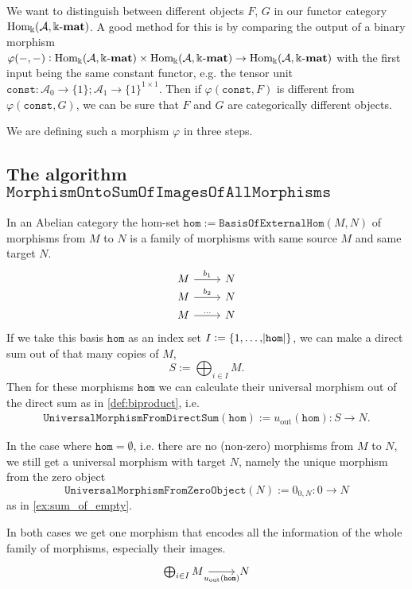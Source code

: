 
We want to distinguish between different objects $F$, $G$ in our functor category $\mathrm{Hom_{\Bbbk}}(\mathcal{A},\Bbbk\textnormal{-}\mathbf{mat})$. A good method for this is by comparing the output of a
binary morphism\\
$\varphi( -, - ) : \mathrm{Hom_{\Bbbk}}(\mathcal{A},\Bbbk\textnormal{-}\mathbf{mat}) \times \mathrm{Hom_{\Bbbk}}(\mathcal{A},\Bbbk\textnormal{-}\mathbf{mat}) \rightarrow \mathrm{Hom_{\Bbbk}}(\mathcal{A},\Bbbk\textnormal{-}\mathbf{mat})$ with the first input being the same constant functor,
e.g. the tensor unit $\mathtt{const} : \mathcal{A}_{0} \rightarrow \{1\}; \mathcal{A}_{1} \rightarrow \{1\}^{1\times 1}$.
Then if $\varphi( \mathtt{const}, F )$ is different from $\varphi( \mathtt{const}, G )$, we can be sure that $F$ and $G$ are categorically different objects.

We are defining such a morphism $\varphi$ in three steps.

\subsection{The algorithm $\mathtt{MorphismOntoSumOfImagesOfAllMorphisms}$}

In an Abelian category the hom-set $\mathtt{hom} := \mathtt{BasisOfExternalHom}( M, N )$ of morphisms from $M$ to $N$ is a family of
morphisms with same source $M$ and same target $N$.
\[
\begin{tikzcd}[
  row sep=0.5ex,
]
M \arrow[r, "b_{1}"] & N \\
M \arrow[r, "b_{2}"] & N \\
M \arrow[r, "\dots"] & N
\end{tikzcd}
\]
If we take this basis $\mathtt{hom}$ as an index set $I := \{1,\dots,\abs{\mathtt{hom}}\}$, we can make a direct sum out of that many copies of $M$,
\[
S := \bigoplus_{i\in I} M.
\]
Then for these morphisms $\mathtt{hom}$ we can calculate their universal morphism out of the direct sum as in \ref{def:biproduct}, i.e.
\begin{align*}
\mathtt{UniversalMorphismFromDirectSum}( \mathtt{hom} ) := u_{\text{out}}(\mathtt{hom}) : S \rightarrow N.
\end{align*}

In the case where $\mathtt{hom} = \emptyset$, i.e. there are no (non-zero) morphisms from $M$ to $N$, we still get a
universal morphism with target $N$, namely the unique morphism from the zero object
\[
\mathtt{UniversalMorphismFromZeroObject}( N ) := 0_{0,N} : 0 \rightarrow N
\]
as in \ref{ex:sum_of_empty}.

In both cases we get one morphism that encodes all the information of the whole family of morphisms, especially their images. 
\[
\begin{tikzcd}
\bigoplus_{i\in I} M \arrow[r, "u_{\text{out}}(\mathtt{hom})"'] & N
\end{tikzcd}
\]

